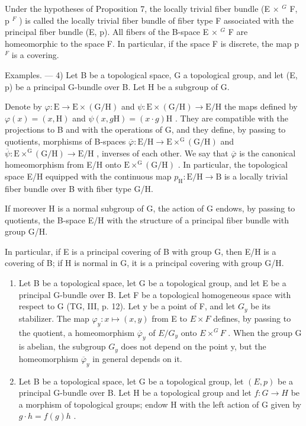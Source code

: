 Under the hypotheses of Proposition 7, the locally trivial fiber bundle (E × \(^{G}\) F, p \(^{F}\) ) is called the locally trivial fiber bundle of fiber type F associated with the principal fiber bundle (E, p). All fibers of the B-space E × \(^{G}\) F are homeomorphic to the space F. In particular, if the space F is discrete, the map p \(^{F}\) is a covering.

Examples. --- 4) Let B be a topological space, G a topological group, and let (E, p) be a principal G-bundle over B. Let H be a subgroup of G.

Denote by \(\varphi\colon\mathrm{E}\to\mathrm{E}\times(\mathrm{G}/\mathrm{H})\) and \(\psi\colon\mathrm{E}\times(\mathrm{G}/\mathrm{H})\to\mathrm{E}/\mathrm{H}\) the maps defined by \(\varphi(x)=(x,\mathrm{H})\) and \(\psi(x,g\mathrm{H})=(x\cdot g)\mathrm{H}\) . They are compatible with the projections to B and with the operations of G, and they define, by passing to quotients, morphisms of B-spaces \(\overline{\varphi}\colon\mathrm{E}/\mathrm{H}\to\mathrm{E}\times^{\mathrm{G}}(\mathrm{G}/\mathrm{H})\) and \(\overline{\psi}\colon\mathrm{E}\times^{\mathrm{G}}(\mathrm{G}/\mathrm{H})\to\mathrm{E}/\mathrm{H}\) , inverses of each other. We say that \(\overline{\varphi}\) is the canonical homeomorphism from E/H onto \(\mathrm{E}\times^{\mathrm{G}}(\mathrm{G}/\mathrm{H})\) . In particular, the topological space E/H equipped with the continuous map \(p_{\mathrm{H}}\colon\mathrm{E}/\mathrm{H}\to\mathrm{B}\) is a locally trivial fiber bundle over B with fiber type G/H.

If moreover H is a normal subgroup of G, the action of G endows, by passing to quotients, the B-space E/H with the structure of a principal fiber bundle with group G/H.

In particular, if E is a principal covering of B with group G, then E/H is a covering of B; if H is normal in G, it is a principal covering with group G/H.

\begin{enumerate}
\def\labelenumi{\arabic{enumi})}
\setcounter{enumi}{4}
\item
  Let B be a topological space, let G be a topological group, and let E be a principal G-bundle over B. Let F be a topological homogeneous space with respect to G (TG, III, p. 12). Let y be a point of F, and let \(G_{y}\) be its stabilizer. The map \(\varphi_{y}\colon x\mapsto(x,y)\) from E to \(E\times F\) defines, by passing to the quotient, a homeomorphism \(\overline{\varphi}_{y}\) of \(E/G_{y}\) onto \(E\times^{G}F\) . When the group G is abelian, the subgroup \(G_{y}\) does not depend on the point y, but the homeomorphism \(\overline{\varphi}_{y}\) in general depends on it.
\item
  Let B be a topological space, let G be a topological group, let \((E,p)\) be a principal G-bundle over B. Let H be a topological group and let \(f:G\to H\) be a morphism of topological groups; endow H with the left action of G given by \(g\cdot h=f(g)h\) .
\end{enumerate}

